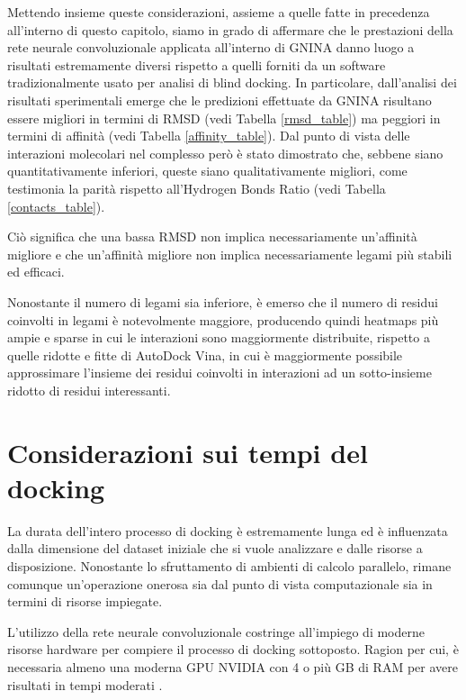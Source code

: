 
Mettendo insieme queste considerazioni, assieme a quelle fatte in precedenza all'interno di questo capitolo, siamo in grado di affermare che le prestazioni della rete neurale convoluzionale applicata all'interno di GNINA danno luogo a risultati estremamente diversi rispetto a quelli forniti da un software tradizionalmente usato per analisi di blind docking. 
In particolare, dall'analisi dei risultati sperimentali emerge che le predizioni effettuate da GNINA risultano essere migliori in termini di RMSD (vedi Tabella \ref{rmsd_table}) ma peggiori in termini di affinità (vedi Tabella \ref{affinity_table}). Dal punto di vista delle interazioni molecolari nel complesso però è stato dimostrato che, sebbene siano quantitativamente inferiori, queste siano qualitativamente migliori, come testimonia la parità rispetto all'Hydrogen Bonds Ratio (vedi Tabella \ref{contacts_table}).

Ciò significa che una bassa RMSD non implica necessariamente un'affinità migliore e che un'affinità migliore non implica necessariamente legami più stabili ed efficaci. 

Nonostante il numero di legami sia inferiore, è emerso che il numero di residui coinvolti in legami è notevolmente maggiore, producendo quindi heatmaps più ampie e sparse in cui le interazioni sono maggiormente distribuite, rispetto a quelle ridotte e fitte di AutoDock Vina, in cui è maggiormente possibile approssimare l'insieme dei residui coinvolti in interazioni ad un sotto-insieme ridotto di residui interessanti.



\section{Considerazioni sui tempi del docking}
La durata dell'intero processo di docking è estremamente lunga ed è influenzata dalla dimensione del dataset iniziale che si vuole analizzare e dalle risorse a disposizione. Nonostante lo sfruttamento di ambienti di calcolo parallelo, rimane comunque un'operazione onerosa sia dal punto di vista computazionale sia in termini di risorse impiegate. 

L'utilizzo della rete neurale convoluzionale costringe all'impiego di moderne risorse hardware per compiere il processo di docking sottoposto. 
Ragion per cui, è necessaria almeno una moderna GPU NVIDIA con 4 o più GB di RAM per avere risultati in tempi moderati \cite{mcnutt_gnina_2021}. 


